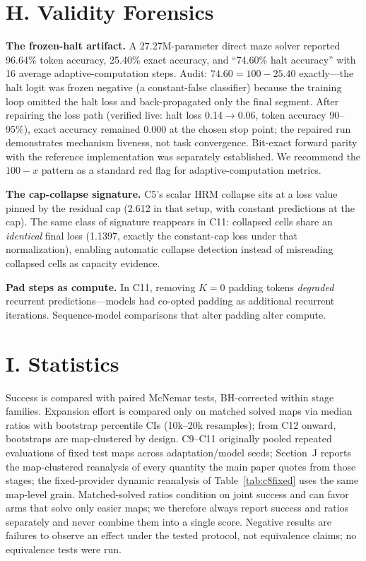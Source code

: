 \documentclass[letterpaper]{article} %
\newcommand{\stage}[1]{\textsc{#1}}
\begin{document}
\section{H. Validity Forensics}

\textbf{The frozen-halt artifact.} A 27.27M-parameter direct maze solver reported 96.64\% token accuracy, 25.40\% exact accuracy, and ``74.60\% halt accuracy'' with 16 average adaptive-computation steps. Audit: $74.60 = 100 - 25.40$ exactly---the halt logit was frozen negative (a constant-false classifier) because the training loop omitted the halt loss and back-propagated only the final segment. After repairing the loss path (verified live: halt loss 0.14$\to$0.06, token accuracy 90--95\%), exact accuracy remained 0.000 at the chosen stop point; the repaired run demonstrates mechanism liveness, not task convergence. Bit-exact forward parity with the reference implementation was separately established. We recommend the $100{-}x$ pattern as a standard red flag for adaptive-computation metrics.

\textbf{The cap-collapse signature.} \stage{C5}'s scalar HRM collapse sits at a loss value pinned by the residual cap (2.612 in that setup, with constant predictions at the cap). The same class of signature reappears in \stage{C11}: collapsed cells share an \emph{identical} final loss (1.1397, exactly the constant-cap loss under that normalization), enabling automatic collapse detection instead of misreading collapsed cells as capacity evidence.

\textbf{Pad steps as compute.} In \stage{C11}, removing $K{=}0$ padding tokens \emph{degraded} recurrent predictions---models had co-opted padding as additional recurrent iterations. Sequence-model comparisons that alter padding alter compute.

\section{I. Statistics}

Success is compared with paired McNemar tests, BH-corrected within stage families. Expansion effort is compared only on matched solved maps via median ratios with bootstrap percentile CIs (10k--20k resamples); from \stage{C12} onward, bootstraps are map-clustered by design. \stage{C9}--\stage{C11} originally pooled repeated evaluations of fixed test maps across adaptation/model seeds; Section~J reports the map-clustered reanalysis of every quantity the main paper quotes from those stages; the fixed-provider dynamic reanalysis of Table~\ref{tab:c8fixed} uses the same map-level grain. Matched-solved ratios condition on joint success and can favor arms that solve only easier maps; we therefore always report success and ratios separately and never combine them into a single score. Negative results are failures to observe an effect under the tested protocol, not equivalence claims; no equivalence tests were run.
\end{document}

